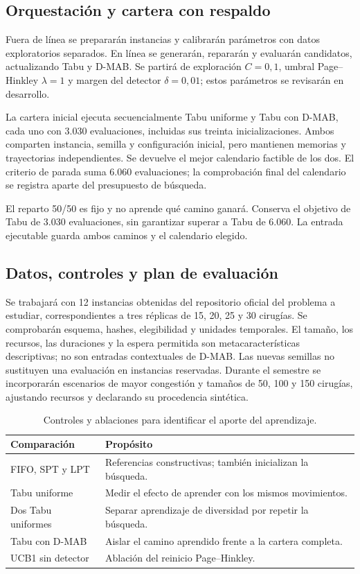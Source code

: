 \documentclass[12pt,letterpaper]{report}
\begin{document}
\clearpage
\subsection{Orquestación y cartera con respaldo}
Fuera de línea se prepararán instancias y calibrarán parámetros con datos
exploratorios separados. En línea se generarán, repararán y evaluarán
candidatos, actualizando Tabu y D-MAB. Se partirá de exploración $C=0{,}1$,
umbral Page--Hinkley $\lambda=1$ y margen del detector $\delta=0{,}01$;
estos parámetros se revisarán en desarrollo.

La cartera inicial ejecuta secuencialmente Tabu uniforme y Tabu con D-MAB,
cada uno con 3.030 evaluaciones, incluidas sus treinta inicializaciones.
Ambos comparten instancia, semilla y configuración inicial, pero mantienen
memorias y trayectorias independientes. Se devuelve el mejor calendario
factible de los dos. El criterio de parada suma 6.060 evaluaciones; la
comprobación final del calendario se registra aparte del presupuesto de búsqueda.

El reparto 50/50 es fijo y no aprende qué camino ganará. Conserva el objetivo
de Tabu de 3.030 evaluaciones, sin garantizar superar a Tabu de 6.060.
La entrada ejecutable guarda ambos caminos y el calendario elegido.

\subsection{Datos, controles y plan de evaluación}
Se trabajará con 12 instancias obtenidas del repositorio oficial del problema
a estudiar, correspondientes a tres réplicas de 15, 20, 25 y 30 cirugías.
Se comprobarán esquema, hashes, elegibilidad y unidades temporales. El tamaño,
los recursos, las duraciones y la espera permitida son metacaracterísticas descriptivas;
no son entradas contextuales de D-MAB. Las nuevas semillas no sustituyen una
evaluación en instancias reservadas. Durante el semestre se incorporarán
escenarios de mayor congestión y tamaños de 50, 100 y 150 cirugías, ajustando
recursos y declarando su procedencia sintética.

\begin{table}[ht]
 \centering
 \caption{Controles y ablaciones para identificar el aporte del aprendizaje.}
 \label{tab:controles}
 \begin{tabular}{@{}p{}p{}@{}}
  \toprule
  Comparación & Propósito\\
  \midrule
  FIFO, SPT y LPT & Referencias constructivas; también inicializan la búsqueda.\\
  Tabu uniforme & Medir el efecto de aprender con los mismos movimientos.\\
  Dos Tabu uniformes & Separar aprendizaje de diversidad por repetir la búsqueda.\\
  Tabu con D-MAB & Aislar el camino aprendido frente a la cartera completa.\\
  UCB1 sin detector & Ablación del reinicio Page--Hinkley.\\
  \bottomrule
 \end{tabular}
\end{table}
\end{document}

